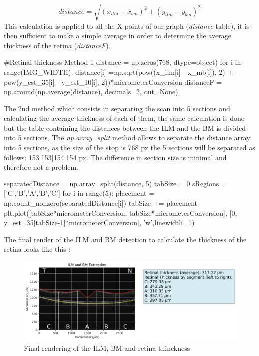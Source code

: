 \documentclass[12pt,a4paper]{scrartcl}
\begin{document}
\[ distance = \sqrt {\left( {x_{ilm} - x_{bm} } \right)^2 + \left( {y_{ilm} - y_{bm} } \right)^2 } \]
This calculation is applied to all the X points of our graph (\emph{distance} table), it is then sufficient to make a simple average in order to determine the average thickness of the retina (\emph{distanceF}).

\begin{python}
#Retinal thickness Method 1
distance = np.zeros(768, dtype=object)
for i in range(IMG_WIDTH):
  distance[i] =np.sqrt(pow((x_ilm[i] - x_mb[i]), 2) + pow(y_est_35[i] - y_est_10[i], 2))*micrometerConversion
distanceF =  np.around(np.average(distance), decimals=2, out=None)

\end{python}
The 2nd method which consists in separating the scan into 5 sections and calculating the average thickness of each of them, the same calculation is done but the table containing the distances between the ILM and the BM is divided into 5 sections. The \emph{np.array\_split} method allows to separate the distance array into 5 sections, as the size of the stop is 768 px the 5 sections will be separated as follows: 153|153|154|154 px. The difference in section size is minimal and therefore not a problem.
\begin{python}
separatedDistance = np.array_split(distance, 5)
tabSize = 0
sRegions = ['C','B','A','B','C']
for i in range(5):
  placement = np.count_nonzero(separatedDistance[i])
  tabSize += placement
  plt.plot([tabSize*micrometerConversion, tabSize*micrometerConversion], [0, y_est_35[tabSize-1]*micrometerConversion], 'w',linewidth=1)
\end{python}
The final render of the ILM and BM detection to calculate the thickness of the retina looks like this : 
\begin{figure}[H]
    \centering
    \includegraphics[width=1\textwidth]{./images/ILM_BM_Extracted.png}
    \caption{Final rendering of the ILM, BM and retina thinckness}
    \label{fig:final_rendering}
\end{figure}
\end{document}

